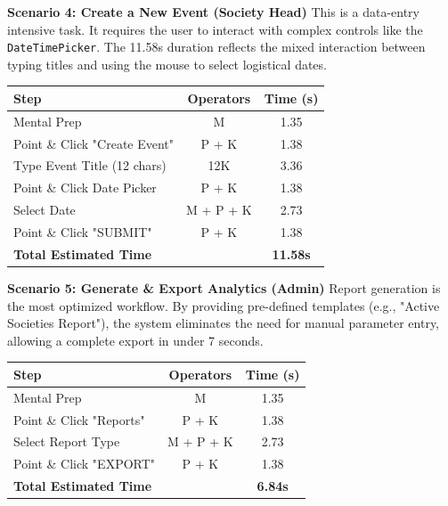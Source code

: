 \documentclass[12pt,a4paper]{article}
\begin{document}
\textbf{Scenario 4: Create a New Event (Society Head)}
This is a data-entry intensive task. It requires the user to interact with complex controls like the \texttt{DateTimePicker}. The 11.58s duration reflects the mixed interaction between typing titles and using the mouse to select logistical dates.
\begin{table}[H]
\centering
\begin{tabular}{lcc}
\toprule
\textbf{Step} & \textbf{Operators} & \textbf{Time (s)} \\
\midrule
Mental Prep & M & 1.35 \\
Point \& Click "Create Event" & P + K & 1.38 \\
Type Event Title (12 chars) & 12K & 3.36 \\
Point \& Click Date Picker & P + K & 1.38 \\
Select Date & M + P + K & 2.73 \\
Point \& Click "SUBMIT" & P + K & 1.38 \\
\midrule
\textbf{Total Estimated Time} & & \textbf{11.58s} \\
\bottomrule
\end{tabular}
\end{table}

\textbf{Scenario 5: Generate \& Export Analytics (Admin)}
Report generation is the most optimized workflow. By providing pre-defined templates (e.g., "Active Societies Report"), the system eliminates the need for manual parameter entry, allowing a complete export in under 7 seconds.
\begin{table}[H]
\centering
\begin{tabular}{lcc}
\toprule
\textbf{Step} & \textbf{Operators} & \textbf{Time (s)} \\
\midrule
Mental Prep & M & 1.35 \\
Point \& Click "Reports" & P + K & 1.38 \\
Select Report Type & M + P + K & 2.73 \\
Point \& Click "EXPORT" & P + K & 1.38 \\
\midrule
\textbf{Total Estimated Time} & & \textbf{6.84s} \\
\bottomrule
\end{tabular}
\end{table}
\end{document}
